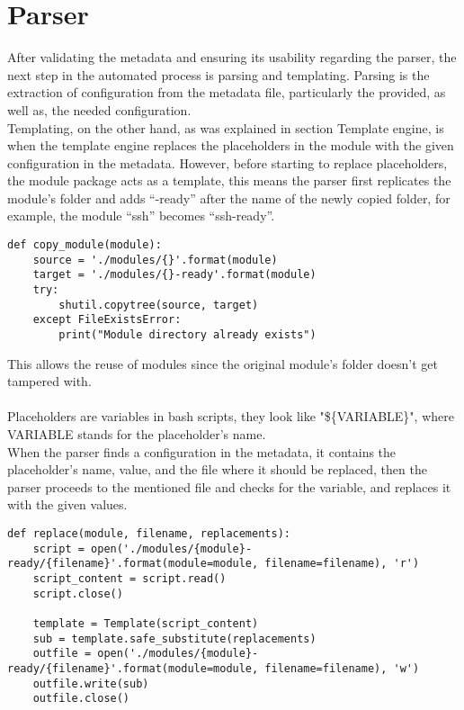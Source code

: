\section{Parser}
After validating the metadata and ensuring its usability regarding the parser, the next step in the automated process is parsing and templating. Parsing is the extraction of configuration from the metadata file, particularly the provided, as well as, the needed configuration.\\
Templating, on the other hand, as was explained in section Template engine, is when the template engine replaces the placeholders in the module with the given configuration in the metadata. However, before starting to replace placeholders, the module package acts as a template, this means the parser first replicates the module’s folder and adds “-ready” after the name of the newly copied folder, for example, the module “ssh” becomes “ssh-ready”.\\

\begin{lstlisting}[caption=Copying directories, style=pythonstyle]
def copy_module(module):
    source = './modules/{}'.format(module)
    target = './modules/{}-ready'.format(module)
    try:
        shutil.copytree(source, target)
    except FileExistsError:
        print("Module directory already exists")
\end{lstlisting}
This allows the reuse of modules since the original module’s folder doesn’t get tampered with.\\
\\
Placeholders are variables in bash scripts, they look like "\$\{VARIABLE\}", where VARIABLE stands for the placeholder’s name.\\ When the parser finds a configuration in the metadata, it contains the placeholder’s name, value, and the file where it should be replaced, then the parser proceeds to the mentioned file and checks for the variable, and replaces it with the given values.\\

\begin{lstlisting}[caption=Templaing, style=pythonstyle]
def replace(module, filename, replacements):
    script = open('./modules/{module}-ready/{filename}'.format(module=module, filename=filename), 'r')
    script_content = script.read()
    script.close()

    template = Template(script_content)
    sub = template.safe_substitute(replacements)
    outfile = open('./modules/{module}-ready/{filename}'.format(module=module, filename=filename), 'w')
    outfile.write(sub)
    outfile.close()
\end{lstlisting}

